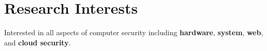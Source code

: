 \section*{Research Interests}
\begin{description}

\item Interested in
  all aspects of computer security including
  \textbf{hardware}, \textbf{system}, \textbf{web}, and \textbf{cloud security}.
\end{description}
